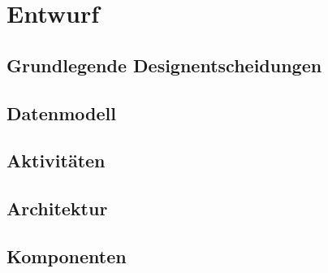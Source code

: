 \chapter{Entwurf}

\section{Grundlegende Designentscheidungen}

\section{Datenmodell}

\section{Aktivitäten}

\section{Architektur}

\section{Komponenten}